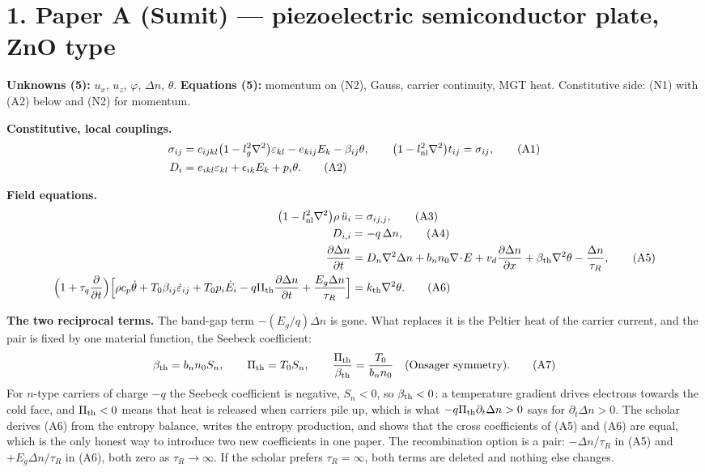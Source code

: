 \documentclass[11pt]{article}
\begin{document}
\section*{1. Paper A (Sumit) --- piezoelectric semiconductor plate, ZnO type}

\noindent\textbf{Unknowns (5):} $u_x$, $u_z$, $\varphi$, $\Delta n$, $\theta$. \quad
\textbf{Equations (5):} momentum on (N2), Gauss, carrier continuity, MGT heat.
Constitutive side: (N1) with (A2) below and (N2) for momentum.

\noindent\textbf{Constitutive, local couplings.}
\begin{align}
\sigma_{ij}&=c_{ijkl}\bigl(1-l_g^2\nabla^2\bigr)\varepsilon_{kl}-e_{kij}E_k-\beta_{ij}\theta,
\qquad \bigl(1-l_{\rm nl}^2\nabla^2\bigr)t_{ij}=\sigma_{ij}, \tag{A1}\\
D_i&=e_{ikl}\varepsilon_{kl}+\epsilon_{ik}E_k+p_i\theta . \tag{A2}
\end{align}

\noindent\textbf{Field equations.}
\begin{align}
\bigl(1-l_{\rm nl}^2\nabla^2\bigr)\rho\,\ddot u_i&=\sigma_{ij,j}, \tag{A3}\\
D_{i,i}&=-q\,\Delta n, \tag{A4}\\
\frac{\partial\Delta n}{\partial t}&=D_n\nabla^2\Delta n+b_nn_0\nabla\!\cdot\!E
+v_d\frac{\partial\Delta n}{\partial x}+\beta_{\rm th}\nabla^2\theta-\frac{\Delta n}{\tau_R}, \tag{A5}\\
\Bigl(1+\tau_q\frac{\partial}{\partial t}\Bigr)
\Bigl[\rho c_p\dot\theta+T_0\beta_{ij}\dot\varepsilon_{ij}
+T_0p_i\dot E_i-q\Pi_{\rm th}\frac{\partial\Delta n}{\partial t}
+\frac{E_g\Delta n}{\tau_R}\Bigr]&=k_{\rm th}\nabla^2\theta . \tag{A6}
\end{align}

\noindent\textbf{The two reciprocal terms.} The band-gap term $-(E_g/q)\dot{\Delta n}$ is gone. What
replaces it is the Peltier heat of the carrier current, and the pair is fixed by one material function,
the Seebeck coefficient:
\begin{equation}
\beta_{\rm th}=b_nn_0S_n,\qquad \Pi_{\rm th}=T_0S_n,\qquad
\frac{\Pi_{\rm th}}{\beta_{\rm th}}=\frac{T_0}{b_nn_0}\quad\text{(Onsager symmetry).}
\tag{A7}
\end{equation}
For $n$-type carriers of charge $-q$ the Seebeck coefficient is negative, $S_n<0$, so
$\beta_{\rm th}<0$: a temperature gradient drives electrons towards the cold face, and $\Pi_{\rm th}<0$
means that heat is released when carriers pile up, which is what $-q\Pi_{\rm th}\partial_t\Delta n>0$
says for $\partial_t\Delta n>0$. The scholar derives (A6) from the entropy balance, writes the entropy
production, and shows that the cross coefficients of (A5) and (A6) are equal, which is the only honest
way to introduce two new coefficients in one paper. The recombination option is a pair: $-\Delta n/\tau_R$
in (A5) and $+E_g\Delta n/\tau_R$ in (A6), both zero as $\tau_R\to\infty$. If the scholar prefers
$\tau_R=\infty$, both terms are deleted and nothing else changes.
\end{document}
